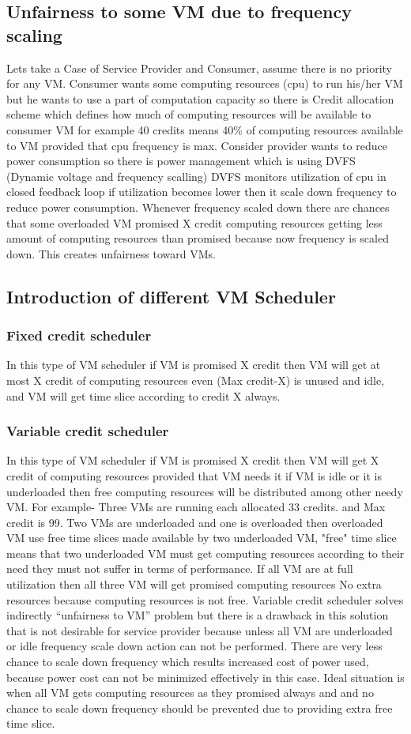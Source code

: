 \documentclass[seminar,twoside]{iitbreport}
\begin{document}
\subsection{Unfairness to some VM due to frequency scaling}
Lets take a Case of Service Provider and Consumer, assume there is no priority for any VM.
Consumer wants some computing resources (cpu) to run his/her VM but he wants to use a part of computation capacity so
there is Credit allocation scheme which defines how much of computing resources will be available to consumer VM for example 
40 credits means 40\% of computing resources available to VM provided that cpu frequency is max.
Consider provider wants to reduce power consumption so there is power management which is using DVFS (Dynamic voltage and frequency scalling)
DVFS monitors utilization of cpu in closed feedback loop if utilization becomes lower then it scale down frequency to reduce power 
consumption. Whenever frequency scaled down there are chances that some overloaded VM promised X credit computing resources getting 
less amount of computing resources than promised because now frequency is scaled down. This creates unfairness toward VMs.
\subsection{Introduction of different VM Scheduler}
\subsubsection{ Fixed credit scheduler}
In this type of VM scheduler if VM is promised X credit then VM will get at most X credit of computing resources even (Max credit-X) is unused and
idle, and VM will get time slice according to credit X always.
\subsubsection{ Variable credit scheduler}
In this type of VM scheduler if VM is promised X credit then VM will get X credit of computing resources provided that VM needs it
if VM is idle or it is underloaded then free computing resources will be distributed among other needy VM.
For example- Three VMs are running each allocated 33 credits. and Max credit is 99.
Two VMs are underloaded and one is overloaded then overloaded VM use free time slices made available by two underloaded VM, "free" time slice
means that two underloaded VM must get computing resources according to their need they must not suffer in terms of performance.
If all VM are at full utilization then all three VM will get promised computing resources No extra resources because computing resources is not free. 
Variable credit scheduler solves indirectly ``unfairness to VM'' problem but there is a drawback in this solution 
that is not desirable for service provider because unless all VM are underloaded or idle frequency scale down action can not be performed. 
There are very less chance to scale down frequency which results increased cost of power used, 
because power cost can not be minimized effectively in this case.
Ideal situation is when all VM gets computing resources as they promised always and 
and no chance to scale down frequency should be prevented due to providing extra free time slice. 
\end{document}
